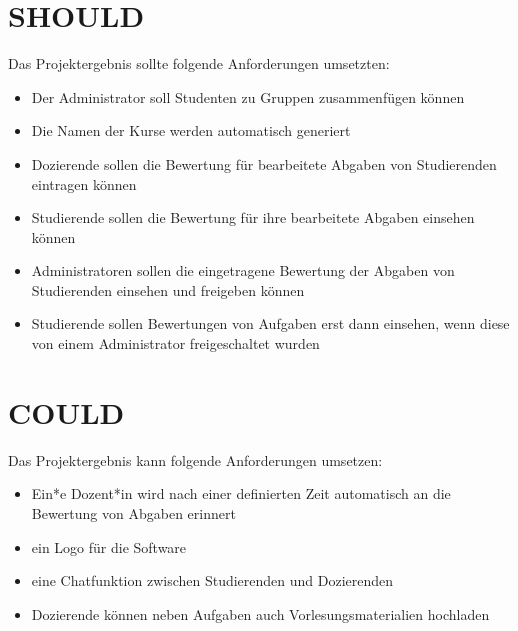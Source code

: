 \section{SHOULD}
Das Projektergebnis sollte folgende Anforderungen umsetzten:
\begin{itemize}
\item Der Administrator soll Studenten zu Gruppen zusammenfügen können
\item Die Namen der Kurse werden automatisch generiert
\item Dozierende sollen die Bewertung für bearbeitete Abgaben von Studierenden eintragen können
\item Studierende sollen die Bewertung für ihre bearbeitete Abgaben einsehen können
\item Administratoren sollen die eingetragene Bewertung der Abgaben von Studierenden einsehen und freigeben können
\item Studierende sollen Bewertungen von Aufgaben erst dann einsehen, wenn diese von einem Administrator freigeschaltet wurden
\end{itemize}


\section{COULD}
Das Projektergebnis kann folgende Anforderungen umsetzen:
\begin{itemize}
\item Ein*e Dozent*in wird nach einer definierten Zeit automatisch an die Bewertung von Abgaben erinnert
\item ein Logo für die Software
\item eine Chatfunktion zwischen Studierenden und Dozierenden
\item Dozierende können neben Aufgaben auch Vorlesungsmaterialien hochladen
\end{itemize}





